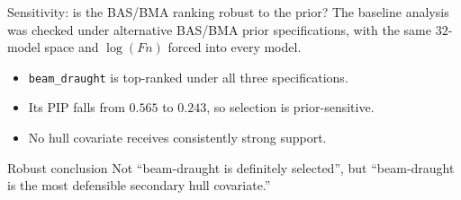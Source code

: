 \documentclass[11pt,aspectratio=169]{beamer}
\newcommand{\Fn}{\ensuremath{F\!n}}
\begin{document}
\begin{frame}{Sensitivity: is the BAS/BMA ranking robust to the prior?}
	\small
	The baseline analysis was checked under alternative BAS/BMA prior specifications,
	with the same $32$-model space and $\log(\Fn)$ forced into every model.
	\vspace{0.4em}
	\begin{center}
		\scriptsize
	\end{center}
	\begin{itemize}
		\item \texttt{beam\_draught} is top-ranked under all three specifications.
		\item Its PIP falls from $0.565$ to $0.243$, so selection is prior-sensitive.
		\item No hull covariate receives consistently strong support.
	\end{itemize}
	\begin{block}{Robust conclusion}
		Not ``beam-draught is definitely selected'', but ``beam-draught is the most
		defensible secondary hull covariate.''
	\end{block}
\end{frame}
\end{document}
